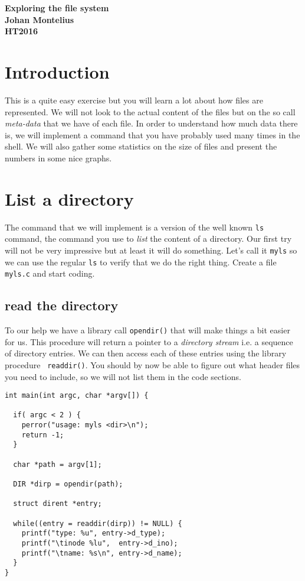 \documentclass[a4paper,11pt]{article}
\begin{document}
\begin{center} \vspace{20pt} \textbf{\large Exploring the file system}\\
\vspace{10pt} \textbf{Johan Montelius}\\ \vspace{10pt} \textbf{HT2016}
\end{center}


\section{Introduction}

This is a quite easy exercise but you will learn a lot about how files
are represented. We will not look to the actual content of the files
but on the so call {\em meta-data} that we have of each file. In order
to understand how much data there is, we will implement a command that
you have probably used many times in the shell. We will also gather
some statistics on the size of files and present the numbers in some
nice graphs.


\section{List a directory}

The command that we will implement is a version of the well known
{\tt ls} command, the command you use to {\em list} the content of a
directory. Our first try will not be very impressive but at least it
will do something. Let's call it {\tt myls} so we can use the regular
{\tt ls} to verify that we do the right thing. Create a file {\tt
  myls.c} and start coding.


\subsection{read the directory}

To our help we have a library call {\tt opendir()} that will make
things a bit easier for us. This procedure will return a pointer to a
{\em directory stream} i.e. a sequence of directory entries. We can
then access each of these entries using the library procedure {\tt
  readdir()}. You should by now be able to figure out what header
files you need to include, so we will not list them in the code sections.

\begin{lstlisting}
int main(int argc, char *argv[]) {

  if( argc < 2 ) {
    perror("usage: myls <dir>\n");
    return -1;
  }

  char *path = argv[1];

  DIR *dirp = opendir(path);

  struct dirent *entry;

  while((entry = readdir(dirp)) != NULL) {
    printf("type: %u", entry->d_type); 
    printf("\tinode %lu",  entry->d_ino);
    printf("\tname: %s\n", entry->d_name);
  }
}
\end{lstlisting}
\end{document}
